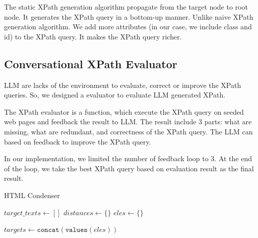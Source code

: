 \documentclass[a4paper]{article}
\begin{document}
The static XPath generation algorithm propagate from the target node to root node. It generates the XPath query in a bottom-up manner. Unlike naive XPath generation algorithm. We add more attributes (in our case, we include class and id) to the XPath query. It makes the XPath query richer.

\subsection{Conversational XPath Evaluator}

LLM are lacks of the environment to evaluate, correct or improve the XPath queries. So, we designed a evaluator to evaluate LLM generated XPath.

The XPath evaluator is a function, which execute the XPath query on seeded web pages and feedback the result to LLM. The result include 3 parts: what are missing, what are redundant, and correctness of the XPath query. The LLM can based on feedback to improve the XPath query.

In our implementation, we limited the number of feedback loop to 3. At the end of the loop, we take the best XPath query based on evaluation result as the final result.


\begin{algorithm}
  \SetAlgoLined
  \caption{HTML Condenser}
  \label{alg:condenser}
  
  $target\_texts \gets []$\;
  $distances \gets \{\}$\;
  $eles \gets \{\}$\;
  

  $targets \gets \texttt{concat}(\texttt{values}(eles))$\;

\end{algorithm}
\end{document}
